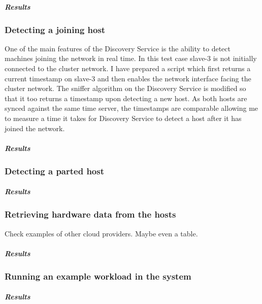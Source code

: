 \subparagraph{Results}

\subsubsection{Detecting a joining host} \label{joining_host}

One of the main features of the Discovery Service is the ability to detect machines joining the network in real time. In this test case slave-3 is not initially connected to the cluster network. I have prepared a script which first returns a current timestamp on slave-3 and then enables the network interface facing the cluster network. The sniffer algorithm on the Discovery Service is modified so that it too returns a timestamp upon detecting  a new host. As both hosts are synced against the same time server, the timestamps are comparable allowing me to measure a time it takes for Discovery Service to detect a host after it has joined the network.

\subparagraph{Results}

\subsubsection{Detecting a parted host}

\subparagraph{Results}
\subsubsection{Retrieving hardware data from the hosts}

Check examples of other cloud providers. Maybe even a table.

\subparagraph{Results}

\subsubsection{Running an example workload in the system}

\subparagraph{Results}